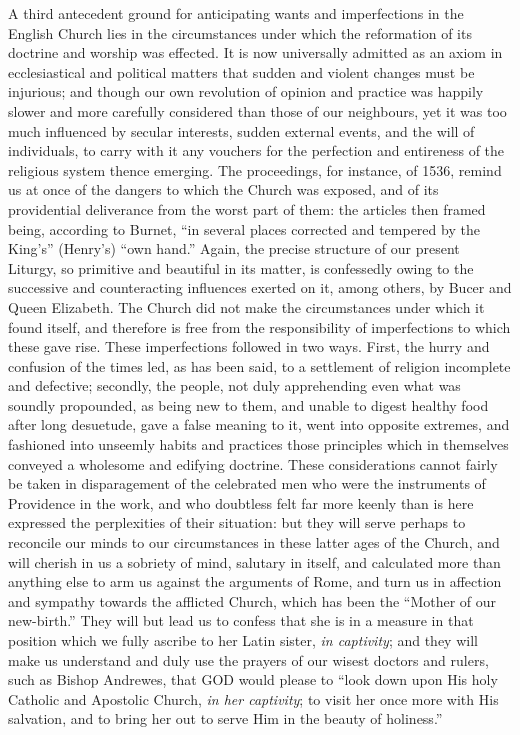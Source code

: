A third antecedent ground for anticipating wants
and imperfections in the English Church lies in the circumstances
under which the reformation of its doctrine and worship was effected.
It is now universally admitted as an axiom in ecclesiastical and
political matters that sudden and violent changes must be
injurious; and though our own revolution of opinion and practice was
happily slower and more carefully considered than those of our
neighbours, yet it was too much influenced by secular interests,
sudden external events, and the will of individuals, to carry with it
any vouchers for the perfection and entireness of the religious system
thence emerging. The proceedings, for instance, of 1536, remind us at
once of the dangers to which the Church was exposed, and of its
providential deliverance from the worst part of them: the articles
then framed being, according to Burnet, ``in several places corrected
and tempered by the King's'' (Henry's) ``own hand.'' Again, the precise
structure of our present Liturgy, so primitive and beautiful in its
matter, is confessedly owing to the successive and counteracting
influences exerted on it, among others, by Bucer and Queen Elizabeth.
The Church did not make the circumstances under which it found itself,
and therefore is free from the responsibility of imperfections to
which these gave rise. These imperfections followed in two ways.
First, the hurry and confusion of the times led, as has been said, to
a settlement of religion incomplete and defective; secondly, the
people, not duly apprehending even what was soundly propounded, as
being new to them, and unable to digest healthy food after long
desuetude, gave a false meaning to it, went into opposite extremes,
and fashioned into unseemly habits and practices those principles
which in themselves conveyed a wholesome and edifying doctrine. These
considerations cannot fairly be taken in disparagement of the
celebrated men who were the instruments of Providence in the work, and
who doubtless felt far more keenly than is here expressed the
perplexities of their situation: but they will serve perhaps to
reconcile our minds to our circumstances in these latter ages of the
Church, and will cherish in us a sobriety of mind, salutary in
itself, and calculated more than anything else to arm us against the
arguments of Rome, and turn us in affection and sympathy towards the
afflicted Church, which has been the ``Mother of our new-birth.'' They
will but lead us to confess that she is in a measure in that position
which we fully ascribe to her Latin sister, \emph{in captivity}; and
they will make us understand and duly use the prayers of our wisest
doctors and rulers, such as Bishop Andrewes, that GOD
would please to ``look down upon His holy Catholic and Apostolic
Church, \emph{in her captivity}; to visit her once more with His
salvation, and to bring her out to serve Him in the beauty of
holiness.''

